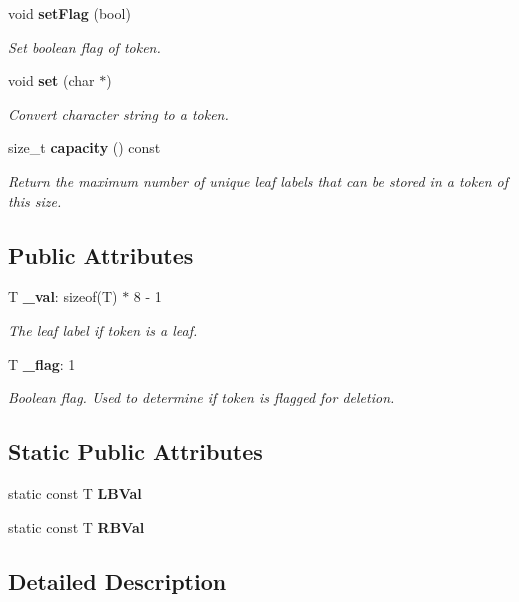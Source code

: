 \begin{CompactItemize}
void {\bf set\-Flag} (bool)
\begin{CompactList}\small\item\em Set boolean flag of token. \item\end{CompactList}\item 
void {\bf set} (char $\ast$)
\begin{CompactList}\small\item\em Convert character string to a token. \item\end{CompactList}\item 
size\_\-t {\bf capacity} () const 
\begin{CompactList}\small\item\em Return the maximum number of unique leaf labels that can be stored in a token of this size. \item\end{CompactList}\end{CompactItemize}
\subsection*{Public Attributes}
\begin{CompactItemize}
\item 
T {\bf \_\-val}: sizeof(T) $\ast$ 8 - 1
\begin{CompactList}\small\item\em The leaf label if token is a leaf. \item\end{CompactList}\item 
T {\bf \_\-flag}: 1
\begin{CompactList}\small\item\em Boolean flag. Used to determine if token is flagged for deletion. \item\end{CompactList}\end{CompactItemize}
\subsection*{Static Public Attributes}
\begin{CompactItemize}
\item 
static const T {\bf LBVal}
\item 
static const T {\bf RBVal}
\end{CompactItemize}


\subsection{Detailed Description}
